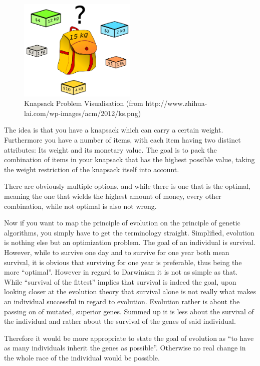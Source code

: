 \documentclass[11pt,a4paper]{article}
\begin{document}
\begin{figure}[h!]
  \centering
  \includegraphics[width=0.5\textwidth]{ks.png}
  \caption{Knapsack Problem Visualisation (from http://www.zhihua-lai.com/wp-images/acm/2012/ks.png)}
  \label{ks}
\end{figure}

The idea is that you have a knapsack which can carry a certain weight. Furthermore you have a number of items, with each item having two distinct attributes: Its weight and its monetary value. The goal is to pack the combination of items in your knapsack that has the highest possible value, taking the weight restriction of the knapsack itself into account.

There are obviously multiple options, and while there is one that is the optimal, meaning the one that wields the highest amount of money, every other combination, while not optimal is also not wrong.

Now if you want to map the principle of evolution on the principle of genetic algorithms, you simply have to get the terminology straight. Simplified, evolution is nothing else but an optimization problem. The goal of an individual is survival. However, while to survive one day and to survive for one year both mean survival, it is obvious that surviving for one year is preferable, thus being the more “optimal”. However in regard to Darwinism it is not as simple as that. While “survival of the fittest” implies that survival is indeed the goal, upon looking closer at the evolution theory that survival alone is not really what makes an individual successful in regard to evolution. Evolution rather is about the passing on of mutated, superior genes. Summed up it is less about the survival of the individual and rather about the survival of the genes of said individual.

Therefore it would be more appropriate to state the goal of evolution as “to have as many individuals inherit the genes as possible”. Otherwise no real change in the whole race of the individual would be possible.
\end{document}
